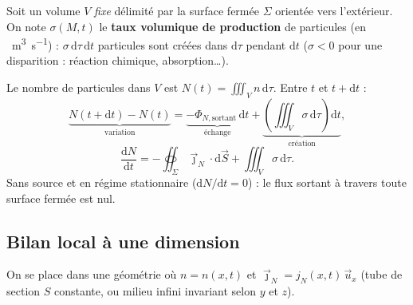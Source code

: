 \documentclass[11pt,a4paper]{article}
\newcommand{\jn}{\vec{\jmath}_N}
\newcommand{\dd}{\mathrm{d}}
\newcommand{\ux}{\vec{u}_x}
\begin{document}
\begin{demo}[title={Démonstration : bilan global}]
Soit un volume $V$ \emph{fixe} délimité par la surface fermée $\Sigma$ orientée vers
l'extérieur. On note $\sigma(M,t)$ le \textbf{taux volumique de production} de particules
(en \si{\per\cubic\metre\per\second}) : $\sigma\,\dd\tau\,\dd t$ particules sont créées
dans $\dd\tau$ pendant $\dd t$ ($\sigma<0$ pour une disparition : réaction chimique,
absorption\dots).

Le nombre de particules dans $V$ est $N(t)=\iiint_V n\,\dd\tau$. Entre $t$ et $t+\dd t$ :
\[ \underbrace{N(t+\dd t)-N(t)}_{\text{variation}}
   = \underbrace{-\Phi_{N,\text{sortant}}\,\dd t}_{\text{échange}}
   + \underbrace{\left(\iiint_V\sigma\,\dd\tau\right)\dd t}_{\text{création}}, \]
\[ \boxed{\dfrac{\dd N}{\dd t} = -\oiint_\Sigma \jn\cdot\dd\vec S + \iiint_V \sigma\,\dd\tau.} \]
Sans source et en régime stationnaire ($\dd N/\dd t=0$) : le flux sortant à travers toute
surface fermée est nul.
\end{demo}

\subsection{Bilan local à une dimension}

On se place dans une géométrie où $n=n(x,t)$ et $\jn=j_N(x,t)\,\ux$ (tube de section
$S$ constante, ou milieu infini invariant selon $y$ et $z$).

\begin{center}
\end{center}
\end{document}
